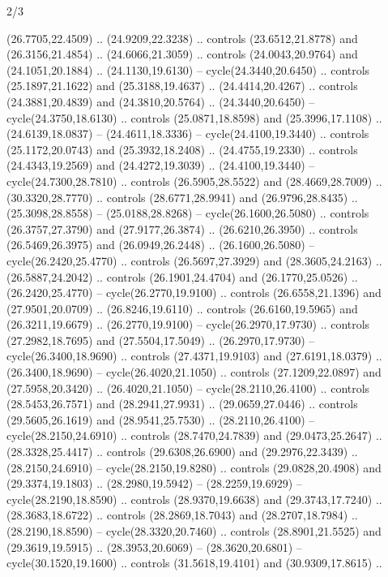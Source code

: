 \begin{flagdescription}{2/3}
\begin{scope}[yshift=\flagwidth,scale=\flagwidth/1241.93737]
\begin{scope}[y=-1mm, x=1mm,draw=gold,fill=blue,line join=miter,miter limit=4,line width=1.8\lw]
\begin{scope}[y=1mm, x=1mm, yscale=-1,shift={(573.68mm+\str,145.75)}]
\begin{scope}[scale=1.35,shift={(-9,-3)}]
\begin{scope}[scale=0.55]
\begin{scope}[scale=1.333]
    (26.7705,22.4509) .. (24.9209,22.3238) .. controls (23.6512,21.8778) and
    (26.3156,21.4854) .. (24.6066,21.3059) .. controls (24.0043,20.9764) and
    (24.1051,20.1884) .. (24.1130,19.6130) -- cycle(24.3440,20.6450) .. controls
    (25.1897,21.1622) and (25.3188,19.4637) .. (24.4414,20.4267) .. controls
    (24.3881,20.4839) and (24.3810,20.5764) .. (24.3440,20.6450) --
    cycle(24.3750,18.6130) .. controls (25.0871,18.8598) and (25.3996,17.1108) ..
    (24.6139,18.0837) -- (24.4611,18.3336) -- cycle(24.4100,19.3440) .. controls
    (25.1172,20.0743) and (25.3932,18.2408) .. (24.4755,19.2330) .. controls
    (24.4343,19.2569) and (24.4272,19.3039) .. (24.4100,19.3440) --
    cycle(24.7300,28.7810) .. controls (26.5905,28.5522) and (28.4669,28.7009) ..
    (30.3320,28.7770) .. controls (28.6771,28.9941) and (26.9796,28.8435) ..
    (25.3098,28.8558) -- (25.0188,28.8268) -- cycle(26.1600,26.5080) .. controls
    (26.3757,27.3790) and (27.9177,26.3874) .. (26.6210,26.3950) .. controls
    (26.5469,26.3975) and (26.0949,26.2448) .. (26.1600,26.5080) --
    cycle(26.2420,25.4770) .. controls (26.5697,27.3929) and (28.3605,24.2163) ..
    (26.5887,24.2042) .. controls (26.1901,24.4704) and (26.1770,25.0526) ..
    (26.2420,25.4770) -- cycle(26.2770,19.9100) .. controls (26.6558,21.1396) and
    (27.9501,20.0709) .. (26.8246,19.6110) .. controls (26.6160,19.5965) and
    (26.3211,19.6679) .. (26.2770,19.9100) -- cycle(26.2970,17.9730) .. controls
    (27.2982,18.7695) and (27.5504,17.5049) .. (26.2970,17.9730) --
    cycle(26.3400,18.9690) .. controls (27.4371,19.9103) and (27.6191,18.0379) ..
    (26.3400,18.9690) -- cycle(26.4020,21.1050) .. controls (27.1209,22.0897) and
    (27.5958,20.3420) .. (26.4020,21.1050) -- cycle(28.2110,26.4100) .. controls
    (28.5453,26.7571) and (28.2941,27.9931) .. (29.0659,27.0446) .. controls
    (29.5605,26.1619) and (28.9541,25.7530) .. (28.2110,26.4100) --
    cycle(28.2150,24.6910) .. controls (28.7470,24.7839) and (29.0473,25.2647) ..
    (28.3328,25.4417) .. controls (29.6308,26.6900) and (29.2976,22.3439) ..
    (28.2150,24.6910) -- cycle(28.2150,19.8280) .. controls (29.0828,20.4908) and
    (29.3374,19.1803) .. (28.2980,19.5942) -- (28.2259,19.6929) --
    cycle(28.2190,18.8590) .. controls (28.9370,19.6638) and (29.3743,17.7240) ..
    (28.3683,18.6722) .. controls (28.2869,18.7043) and (28.2707,18.7984) ..
    (28.2190,18.8590) -- cycle(28.3320,20.7460) .. controls (28.8901,21.5525) and
    (29.3619,19.5915) .. (28.3953,20.6069) -- (28.3620,20.6801) --
    cycle(30.1520,19.1600) .. controls (31.5618,19.4101) and (30.9309,17.8615) ..

\end{scope}
\end{scope}
\end{scope}
\end{scope}
\end{scope}
\end{scope}
\end{flagdescription}
